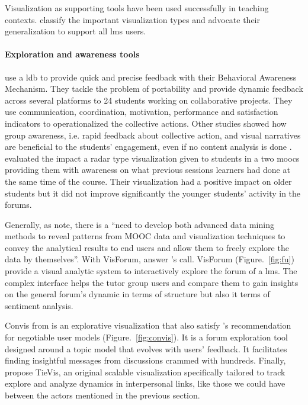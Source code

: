 \documentclass[a4paper,twoside]{article}
\begin{document}
Visualization as supporting tools have been used successfully in teaching contexts. \cite{Heer2012} classify the important visualization types and \cite{Emmons2017,Leeuwen2014} advocate their generalization to support all \gls{lms} users.

\paragraph{Exploration and awareness tools}
\cite{Medina2016} use a \gls{ldb} to provide quick and precise feedback with their Behavioral Awareness Mechanism.  They tackle the problem of portability and provide dynamic feedback across several platforms to 24 students working on collaborative projects.  They use communication, coordination, motivation, performance and satisfaction indicators to operationalized the collective actions.  Other studies showed how group awareness, i.e. rapid feedback about collective action, and visual narratives \citep{Yousuf2015} are beneficial to the students' engagement, even if no content analysis is done \citep{Davis2017,May2011,Medina2016}.
\cite{Davis2017} evaluated the impact a radar type visualization given to students in a two \glspl{mooc} providing them with awareness on what previous sessions learners had done at the same time of the course.  Their visualization had a positive impact on older students but it did not improve significantly the younger students' activity in the forums.

Generally, as \cite{Qu2015} note, there is a  ``need to develop both advanced data mining methods to reveal patterns from MOOC data and visualization techniques to convey the analytical results to end users and allow them to freely explore the data by themselves''.
With VisForum, \cite{Fu2017} answer  \cite{Qu2015}'s call.  VisForum  (Figure.~\ref{fig:fu}) provide a visual analytic system to interactively explore the forum of a \gls{lms}.  The complex interface helps the tutor group users and compare them to gain insights on the general forum's dynamic in terms of structure but also it terms of sentiment analysis.

Convis from \cite{Hoque2016} is an explorative visualization that also satisfy \cite{Bull2016}'s recommendation for negotiable user models (Figure.~\ref{fig:convis}).  It is a forum exploration tool designed around a topic model that evolves with users' feedback.   It facilitates finding insightful messages from discussions
crammed with hundreds.
Finally, \cite{Guo2017} propose TieVis, an original scalable visualization specifically tailored to track explore and analyze dynamics in interpersonal links, like those we could have between the actors mentioned in the previous section.
\end{document}

